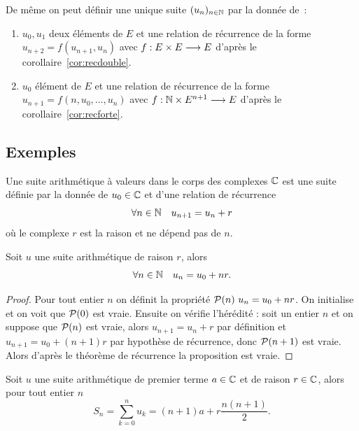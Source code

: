 De même on peut définir une unique suite \((u_n)_{n\in\N}\) par la donnée de~:
\begin{enumerate}
  \item \(u_0, u_1\) deux éléments de \(E\) et une relation de récurrence de la
    forme \(u_{n + 2} = f(u_{n + 1},u_{n})\) avec \(\fonctionR{f}{E\times
    E}{E}\) d'après le corollaire~\ref{cor:recdouble}.
  \item \(u_0\) élément de \(E\) et une relation de récurrence de la forme
    \(u_{n + 1} = f(n, u_{0},\ldots, u_{n})\) avec \(\fonctionR{f}{\N\times E^{n
    + 1}}{E}\) d'après le corollaire~\ref{cor:recforte}.
\end{enumerate}

\subsection{Exemples}
\begin{defdef}
  Une suite arithmétique à valeurs dans le corps des complexes \(\C\) est une
  suite définie par la donnée de \(u_0\in\C\) et d'une relation de récurrence
  \begin{equation}
    \forall n \in \N \quad u_{n + 1} = u_n + r
  \end{equation}
  où le complexe \(r\) est la raison et ne dépend pas de \(n\).
\end{defdef}

\begin{prop}
  Soit \(u\) une suite arithmétique de raison \(r\), alors
  \begin{equation}
    \forall n \in \N \quad u_n = u_0 + nr.
  \end{equation}
\end{prop}

\begin{proof}
  Pour tout entier \(n\) on définit la propriété \(\P(n) \ u_n = u_0 + nr\). On
  initialise et on voit que \(\P(0)\) est vraie. Ensuite on vérifie l'hérédité :
  soit un entier \(n\) et on suppose que \(\P(n)\) est vraie, alors \(u_{n + 1}
  = u_n + r\) par définition et \(u_{n + 1} = u_0 + (n + 1)r\) par hypothèse de
  récurrence, donc \(\P(n + 1)\) est vraie. Alors d'après le théorème de
  récurrence la proposition est vraie.
\end{proof}

\begin{prop}
  Soit \(u\) une suite arithmétique de premier terme \(a\in\C\) et de raison
  \(r\in\C\), alors pour tout entier \(n\)
  \begin{equation}
    S_n = \sum_{k = 0}^n u_k = (n + 1)a + r\frac{n(n + 1)}{2}.
  \end{equation}
\end{prop}

